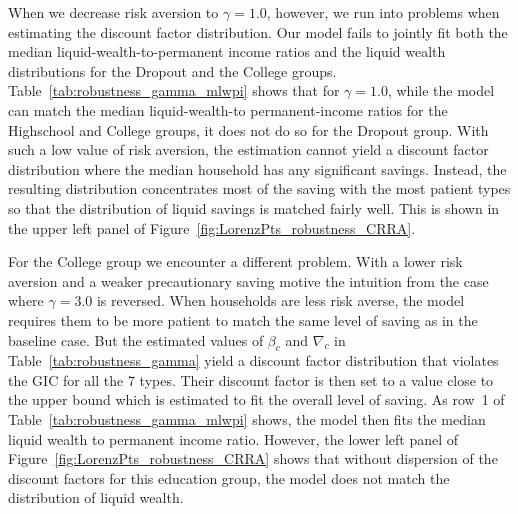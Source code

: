 \documentclass[\latexroot/\projectname]{subfiles}
\begin{document}
When we decrease risk aversion to $\gamma=1.0$, however, we run into problems when estimating the discount factor distribution.
Our model fails to jointly fit both the median liquid-wealth-to-permanent income ratios and the liquid wealth distributions for the Dropout and the College groups.
Table~\ref{tab:robustness_gamma_mlwpi} shows that for $\gamma=1.0$, while the model can match the median liquid-wealth-to permanent-income ratios for the Highschool and College groups, it does not do so for the Dropout group.
With such a low value of risk aversion, the estimation cannot yield a discount factor distribution where the median household has any significant savings.
Instead, the resulting distribution concentrates most of the saving with the most patient types so that the distribution of liquid savings is matched fairly well.
This is shown in the upper left panel of Figure~\ref{fig:LorenzPts_robustness_CRRA}.

For the College group we encounter a different problem.
With a lower risk aversion and a weaker precautionary saving motive the intuition from the case where $\gamma=3.0$ is reversed.
When households are less risk averse, the model requires them to be more patient to match the same level of saving as in the baseline case.
But the estimated values of $\beta_c$ and $\nabla_c$ in Table~\ref{tab:robustness_gamma} yield a discount factor distribution that violates the GIC for all the 7 types.
Their discount factor is then set to a value close to the upper bound which is estimated to fit the overall level of saving.
As row~1 of Table~\ref{tab:robustness_gamma_mlwpi} shows, the model then fits the median liquid wealth to permanent income ratio.
However, the lower left panel of Figure~\ref{fig:LorenzPts_robustness_CRRA} shows that without dispersion of the discount factors for this education group, the model does not match the distribution of liquid wealth.
\end{document}
